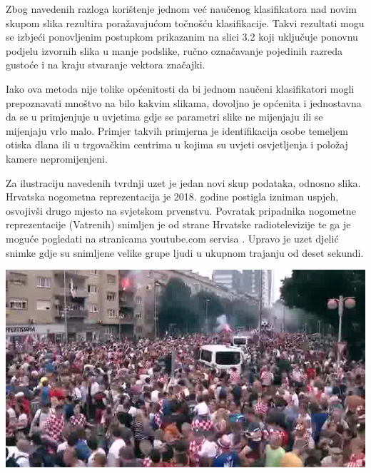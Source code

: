 \documentclass[times, utf8, zavrsni, numeric]{fer}
\begin{document}
\bigbreak

Zbog navedenih razloga korištenje jednom već naučenog klasifikatora nad novim skupom
slika rezultira poražavajućom točnošću klasifikacije. Takvi rezultati mogu se izbjeći
ponovljenim postupkom prikazanim na slici 3.2 koji uključuje ponovnu podjelu
izvornih slika u manje podslike, ručno označavanje pojedinih razreda gustoće i 
na kraju stvaranje vektora značajki. 

\bigbreak

Iako ova metoda nije tolike općenitosti da bi jednom naučeni klasifikatori mogli
prepoznavati mnoštvo na bilo kakvim slikama, dovoljno je općenita i jednostavna
da se u primjenjuje u uvjetima gdje se parametri slike ne mijenjaju ili se mijenjaju vrlo
malo. Primjer takvih primjerna je identifikacija osobe temeljem otiska dlana \citep{1512051}
ili u trgovačkim centrima u kojima su uvjeti osvjetljenja i položaj kamere nepromijenjeni.

\bigbreak

Za ilustraciju navedenih tvrdnji uzet je jedan novi skup podataka, odnosno slika. Hrvatska 
nogometna reprezentacija je 2018. godine postigla izniman uspjeh, osvojivši drugo mjesto
na svjetskom prvenstvu. Povratak pripadnika nogometne reprezentacije (Vatrenih) snimljen
je od strane Hrvatske radiotelevizije te ga je moguće pogledati na stranicama youtube.com
servisa \citep{vatreni}. Upravo je uzet djelić snimke gdje su snimljene 
velike grupe ljudi u ukupnom trajanju od deset sekundi.  

\bigbreak

\begin{minipage}{\linewidth}
\centering
\includegraphics[scale=0.5]{img/data2.jpg}
\end{minipage}
\end{document}
